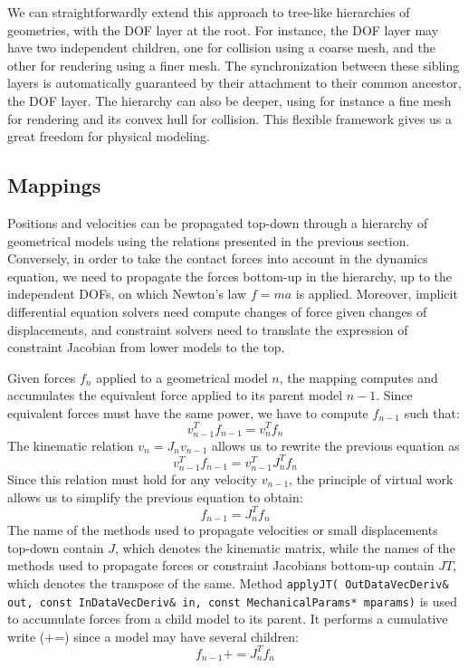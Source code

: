 We can straightforwardly extend this approach to tree-like hierarchies of geometries, with the DOF layer at the root. 
For instance, the DOF layer may have two independent children, one for collision using a coarse mesh, and the other for rendering using a finer mesh. The synchronization between these sibling layers is automatically guaranteed by their attachment to their common ancestor, the DOF layer.
The hierarchy can also be deeper, using for instance a fine mesh for rendering and its convex hull for collision.
This flexible framework gives us a great freedom for physical modeling.

\subsection{Mappings}
Positions and velocities can be propagated top-down through a hierarchy of geometrical models using the relations presented in the previous section. Conversely,
in order to take the contact forces into account in the dynamics equation, we need to propagate the forces bottom-up in the hierarchy, up to the independent DOFs, on which Newton's law $f=ma$ is applied. 
Moreover, implicit differential equation solvers need compute changes of force  given changes of displacements, and constraint solvers need to translate the expression of constraint Jacobian from lower models to the top.

Given forces $f_n$ applied to a geometrical model $n$, the mapping computes and accumulates the equivalent force applied to its parent model $n-1$. 
Since equivalent forces must have the same power, we have to compute $f_{n-1}$ such that:
$$
v_{n-1}^T f_{n-1} = v_n^T f_n
$$
The kinematic relation $v_{n} = J_{n}v_{n-1}$ allows us to rewrite the previous equation as
$$
v_{n-1}^T f_{n-1} = v_{n-1}^T J_{n}^T f_n
$$
Since this relation must hold for any velocity $v_{n-1}$, the principle of virtual work allows us to simplify the previous equation to obtain:
\begin{equation} \label{eq:mapF}
f_{n-1} = J_n^T f_n
\end{equation}
The name of the methods used to propagate velocities or small displacements top-down contain $J$, which denotes the kinematic matrix, while the names of the methods used to propagate forces or constraint Jacobians bottom-up contain $JT$, which denotes the transpose of the same.
Method \texttt{applyJT( OutDataVecDeriv\& out, const InDataVecDeriv\& in, const MechanicalParams* mparams)} is used to accumulate forces from a child model to its parent. It performs a cumulative write (+=) since a model may have several children:
\begin{equation}
 \label{eq.applyjt}
 f_{n-1} += J_n^T f_n
\end{equation}

